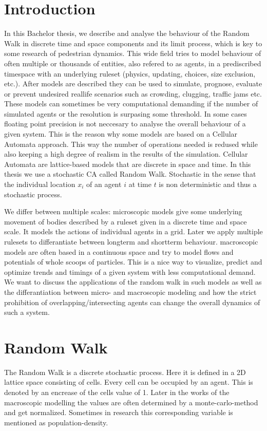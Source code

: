 

\section{Introduction}
In this Bachelor thesis, we describe and analyse the behaviour of the Random Walk in discrete time and space components
and its limit process, which is key to some research of pedestrian dynamics.
This wide field tries to model behaviour of often multiple or thousands of entities, also refered to as agents, in a prediscribed timespace with an underlying 
ruleset (physics, updating, choices, size exclusion, etc.). After models are described they can be used to simulate, prognose, evaluate or prevent undesired reallife scenarios such as crowding, clugging, traffic jams etc. 
These models can sometimes be very computational demanding if the number of simulated agents or the resolution is surpasing some threshold. In some cases floating point precision is not neccesary to analyse the overall behaviour of a given system.
This is the reason why some models are based on a Cellular Automata approach.
This way the number of operations needed is redused while also keeping a high degree of realism in the results of the simulation.
Cellular Automata are lattice-based models that are discrete in space and time. 
In this thesis we use a stochastic CA called Random Walk. Stochastic in the sense that the individual location $x_{i}$ of an agent $i$ at time $t$ is non deterministic and thus a stochastic process.
 
We differ between multiple scales: microscopic models give some underlying movement of bodies described by a ruleset given in a discrete time and space scale. It models the actions of individual agents in a grid. Later we apply multiple rulesets to differantiate between longterm and shortterm behaviour.
macroscopic models are often based in a continuous space and try to model flows and potentials of whole scoops of particles. This is a nice way to visualize, predict and optimize trends and timings of a given system with less computational demand.
We want to discuss the applications of the random walk in such models as well as the differantiation between micro- and macroscopic modeling and how the strict prohibition of overlapping/intersecting agents can change the overall dynamics of such a system. 

\newpage
\section{Random Walk}
The Random Walk is a discrete stochastic process. Here it is defined in a 2D lattice space consisting of cells. Every cell can be occupied by an agent. This is denoted by an encrease of the cells value of 1. 
Later in the works of the macroscopic modelling the values are often determined by a monte-carlo-method and get normalized. 
Sometimes in research this corresponding variable is mentioned as population-density.

